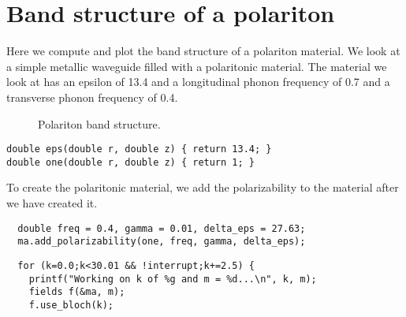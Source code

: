\section{Band structure of a polariton}

\begin{comment}
#include <stdio.h>
#include <stdlib.h>

#include "dactyl.h"

const double rmax = 1.0;
\end{comment}

Here we compute and plot the band structure of a polariton material.  We
look at a simple metallic waveguide filled with a polaritonic material.
The material we look at has an epsilon of 13.4 and a longitudinal phonon
frequency of 0.7 and a transverse phonon frequency of 0.4.

\begin{figure}
\label{polaritonbands}
\caption{Polariton band structure.}
\end{figure}

\begin{verbatim}
double eps(double r, double z) { return 13.4; }
double one(double r, double z) { return 1; }
\end{verbatim}

\begin{comment}
int main(int argc, char **argv) {
  deal_with_ctrl_c();
  const int a = 10;
  const int m = 0;
  double k;
  const int ttot = 1000*a;  
\end{comment}

\begin{comment}
  mat ma(eps, rmax, 0.0, a);
  const char *dirname = make_output_directory(argv[0]);
  printf("Storing output in directory %
  FILE *ban = create_output_file(dirname, "bands");
  ma.set_output_directory(dirname);
\end{comment}

To create the polaritonic material, we add the polarizability to the
material after we have created it.

\begin{verbatim}
  double freq = 0.4, gamma = 0.01, delta_eps = 27.63;
  ma.add_polarizability(one, freq, gamma, delta_eps);
\end{verbatim}

\begin{verbatim}
  for (k=0.0;k<30.01 && !interrupt;k+=2.5) {
    printf("Working on k of %g and m = %d...\n", k, m);
    fields f(&ma, m);
    f.use_bloch(k);
\end{verbatim}

